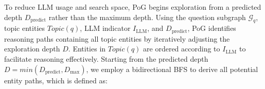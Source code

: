 
To reduce LLM usage and search space, PoG begins exploration from a predicted depth $D_{\text{predict}}$ rather than the maximum depth. Using the question subgraph $\mathcal{G}_q$, topic entities $Topic(q)$, LLM indicator $I_{\text{LLM}}$, and $D_{\text{predict}}$, PoG identifies reasoning paths containing all topic entities by iteratively adjusting the exploration depth $D$. Entities in $Topic(q)$ are ordered according to $I_{\text{LLM}}$ to facilitate reasoning effectively. Starting from the predicted depth $D=min(D_{\text{predict}}, D_{\text{max}})$, we employ a bidirectional BFS to derive all potential entity paths, which is defined as:
